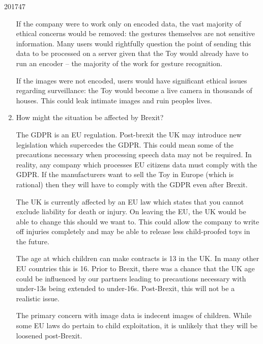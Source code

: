 \documentclass[10pt,\jkfside,a4paper]{article}
\begin{document}
\begin{examquestion}{2017}{4}{7}
\begin{enumerate}[label=(\alph*)]
If the company were to work only on encoded data, the vast majority of ethical
concerns would be removed: the gestures themselves are not sensitive
information. Many users would rightfully question the point of sending this
data to be processed on a server given that the Toy would already have to run
an encoder -- the majority of the work for gesture recognition.

If the images were not encoded, users would have significant ethical issues
regarding surveillance: the Toy would become a live camera in thousands of
houses. This could leak intimate images and ruin peoples lives.

\item How might the situation be affected by Brexit?

The GDPR is an EU regulation. Post-brexit the UK may introduce new
legislation which supercedes the GDPR. This could mean some of the
precautions necessary when processing speech data may not be required.
In reality, any company which processes EU citizens data must comply with
the GDPR\@. If the manufacturers want to sell the Toy in Europe (which is
rational) then they will have to comply with the GDPR even after Brexit.

The UK is currently affected by an EU law which states that you cannot
exclude liability for death or injury. On leaving the EU, the UK would be
able to change this should we want to. This could allow the company to write
off injuries completely and may be able to release less child-proofed toys
in the future.

The age at which children can make contracts is 13 in the UK\@. In many
other EU countries this is 16. Prior to Brexit, there was a chance that the
UK age could be influenced by our partners leading to precautions necessary
with under-13s being extended to under-16s. Post-Brexit, this will not
be a realistic issue.

The primary concern with image data is indecent images of children. While
some EU laws do pertain to child exploitation, it is unlikely that they will
be loosened post-Brexit.

\end{enumerate}

\end{examquestion}
\end{document}
